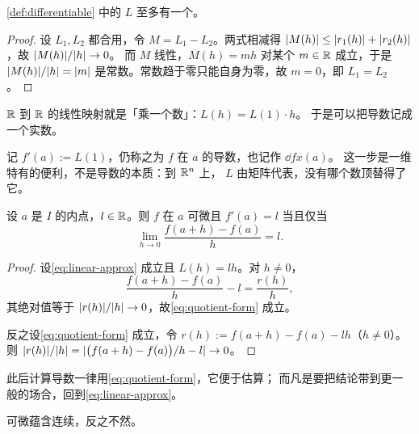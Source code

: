 \begin{proposition}[导数唯一]
  \label{prop:derivative-unique}
  \cref{def:differentiable} 中的 \(L\) 至多有一个。
\end{proposition}

\begin{proof}
  设 \(L_{1}, L_{2}\) 都合用，令 \(M = L_{1}-L_{2}\)。两式相减得
  \(\lvert M(h)\rvert \le \lvert r_{1}(h)\rvert + \lvert r_{2}(h)\rvert\)，故 \(\lvert M(h)\rvert/\lvert h\rvert \to 0\)。
  而 \(M\) 线性，\(M(h) = mh\) 对某个 \(m \in \mathbb{R}\) 成立，于是 \(\lvert M(h)\rvert/\lvert h\rvert = \lvert m\rvert\)
  是常数。常数趋于零只能自身为零，故 \(m=0\)，即 \(L_{1}=L_{2}\)。
\end{proof}

\(\mathbb{R}\) 到 \(\mathbb{R}\) 的线性映射就是「乘一个数」：\(L(h) = L(1) \cdot h\)。
于是可以把导数记成一个实数。

\begin{remark}[记号]
  记 \(f'(a) := L(1)\)，仍称之为 \(f\) 在 \(a\) 的导数，也记作 \(\dd{f}{x}(a)\)。
  这一步是一维特有的便利，不是导数的本质：到 \(\mathbb{R}^{n}\) 上，
  \(L\) 由矩阵代表，没有哪个数顶替得了它。
\end{remark}

\begin{proposition}[与商的形式等价]
  \label{prop:quotient-form}
  设 \(a\) 是 \(I\) 的内点，\(l \in \mathbb{R}\)。则 \(f\) 在 \(a\) 可微且 \(f'(a)=l\)
  当且仅当
  \begin{equation}
    \label{eq:quotient-form}
    \lim_{h \to 0} \frac{f(a+h)-f(a)}{h} = l .
  \end{equation}
\end{proposition}

\begin{proof}
  设\cref{eq:linear-approx} 成立且 \(L(h)=lh\)。对 \(h \neq 0\)，
  \[
    \frac{f(a+h)-f(a)}{h} - l = \frac{r(h)}{h},
  \]
  其绝对值等于 \(\lvert r(h)\rvert/\lvert h\rvert \to 0\)，故\cref{eq:quotient-form} 成立。

  反之设\cref{eq:quotient-form} 成立，令 \(r(h) := f(a+h)-f(a)-lh\)（\(h \neq 0\)）。
  则 \(\lvert r(h)\rvert/\lvert h\rvert = \lvert\bigl(f(a+h)-f(a)\bigr)/h - l\rvert \to 0\)。
\end{proof}

此后计算导数一律用\cref{eq:quotient-form}，它便于估算；
而凡是要把结论带到更一般的场合，回到\cref{eq:linear-approx}。

\begin{proposition}
  \label{prop:diff-implies-cont}
  可微蕴含连续，反之不然。
\end{proposition}

